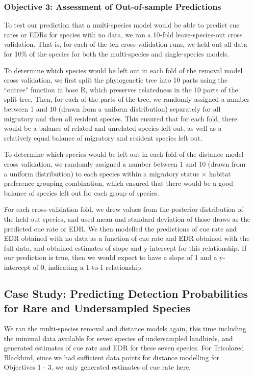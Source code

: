 \documentclass[12pt]{article}
\begin{document}
\subsubsection{Objective 3: Assessment of Out-of-sample Predictions}
\par To test our prediction that a multi-species model would be able to predict cue rates or EDRs for species with no data, we ran a 10-fold leave-species-out cross validation.
That is, for each of the ten cross-validation runs, we held out all data for 10\% of the species for both the multi-species and single-species models.

\par To determine which species would be left out in each fold of the removal model cross validation, we first split the phylogenetic tree into 10 parts using the ``cutree" function in base R, which preserves relatedness in the 10 parts of the split tree.
Then, for each of the parts of the tree, we randomly assigned a number between 1 and 10 (drawn from a uniform distribution) separately for all migratory and then all resident species.
This ensured that for each fold, there would be a balance of related and unrelated species left out, as well as a relatively equal balance of migratory and resident species left out.

\par To determine which species would be left out in each fold of the distance model cross validation, we randomly assigned a number between 1 and 10 (drawn from a uniform distribution) to each species within a migratory status $\times$ habitat preference grouping combination, which ensured that there would be a good balance of species left out for each group of species.

For each cross-validation fold, we drew values from the posterior distribution of the held-out species, and used mean and standard deviation of those draws as the predicted cue rate or EDR.
We then modelled the predictions of cue rate and EDR obtained with no data as a function of cue rate and EDR obtained with the full data, and obtained estimates of slope and y-intercept for this relationship.
If our prediction is true, then we would expect to have a slope of 1 and a y-intercept of 0, indicating a 1-to-1 relationship.

\subsection{Case Study: Predicting Detection Probabilities for Rare and Undersampled Species}
\par We ran the multi-species removal and distance models again, this time including the minimal data available for seven species of undersampled landbirds, and generated estimates of cue rate and EDR for these seven species.
For Tricolored Blackbird, since we had sufficient data points for distance modelling for Objectives 1 - 3, we only generated estimates of cue rate here.
\end{document}
